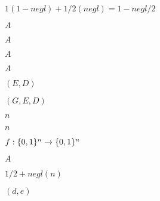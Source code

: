 \documentclass[10pt]{book}
\begin{document}
\begin{mdSnippets}
\begin{mdInlineSnippet}[0900db91dfa8eb30c2669a6877b641c1]%
$1(1-negl) + 1/2(negl) = 1 - negl/2$\end{mdInlineSnippet}%
\begin{mdInlineSnippet}[7fc56270e7a70fa81a5935b72eacbe29]%
$A$\end{mdInlineSnippet}%
\begin{mdInlineSnippet}[7fc56270e7a70fa81a5935b72eacbe29]%
$A$\end{mdInlineSnippet}%
\begin{mdInlineSnippet}[7fc56270e7a70fa81a5935b72eacbe29]%
$A$\end{mdInlineSnippet}%
\begin{mdInlineSnippet}[7fc56270e7a70fa81a5935b72eacbe29]%
$A$\end{mdInlineSnippet}%
\begin{mdInlineSnippet}[c150726dc018e82825c0c3617f46a1c9]%
$(E,D)$\end{mdInlineSnippet}%
\begin{mdInlineSnippet}[b85e5fef323d7d3cb0465e35e6d6d405]%
$(G,E,D)$\end{mdInlineSnippet}%
\begin{mdInlineSnippet}[7b8b965ad4bca0e41ab51de7b31363a1]%
$n$\end{mdInlineSnippet}%
\begin{mdInlineSnippet}[7b8b965ad4bca0e41ab51de7b31363a1]%
$n$\end{mdInlineSnippet}%
\begin{mdInlineSnippet}[3a94c04cd565b30a818026b620d2b5a3]%
$f:\{0,1\}^n\rightarrow\{0,1\}^n$\end{mdInlineSnippet}%
\begin{mdInlineSnippet}[7fc56270e7a70fa81a5935b72eacbe29]%
$A$\end{mdInlineSnippet}%
\begin{mdInlineSnippet}[e59bb7e4e4a31d33c3020d114a1531bb]%
$1/2+ negl(n)$\end{mdInlineSnippet}%
\begin{mdInlineSnippet}[227abc86547f9eb770722f5b4ed1fc7b]%
$(d,e)$\end{mdInlineSnippet}%
\begin{mdInlineSnippet}[7c7e0a4f28d6c65c21d457e1c207318e]%

\end{mdInlineSnippet}
\end{mdSnippets}
\end{document}
